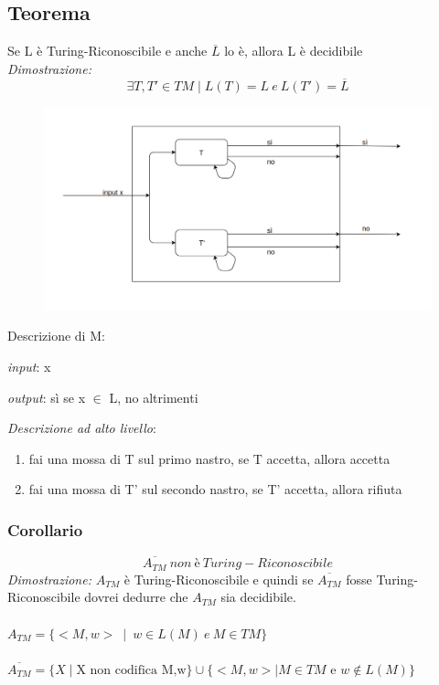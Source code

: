 \subsection{Teorema}
Se L è Turing-Riconoscibile e anche $\overline{L}$ lo è, allora L è decidibile \\
\textit{Dimostrazione:}
\[
	\exists T,T' \in TM \mid L(T)=L \ e \ L(T') = \overline{L}
\] 
\begin{figure}[H]
	\includegraphics[scale=0.35]{automa-parallelo}
\end{figure}
Descrizione di M:
\begin{description}
	\item \textit{input}: x
	\item \textit{output}: s\`i se x $\in$ L, no altrimenti 
	\item \textit{Descrizione ad alto livello}:
		\begin{enumerate}
			\item fai una mossa di T sul primo nastro, se T accetta, allora accetta
			\item fai una mossa di T' sul secondo nastro, se T' accetta, allora rifiuta
		\end{enumerate}			
\end{description}

\subsubsection{Corollario}
\[
	\overline{A_{TM}}\ non\ \text{è}\ Turing-Riconoscibile
\]
\textit{Dimostrazione:} 
$A_{TM}$ è Turing-Riconoscibile e quindi se $\overline{A_{TM}}$ fosse Turing-Riconoscibile dovrei dedurre che $A_{TM}$ sia decidibile. \\
\\
$A_{TM} = \{ <M,w> \ \mid \ w \in L(M) \ e \ M \in TM \}$ \\
\\
$\overline{A_{TM}} = \{ X \mid \text{X non codifica M,w} \} \cup \{ <M,w> \mid M \in TM \text{ e } w \notin L(M) \}$
